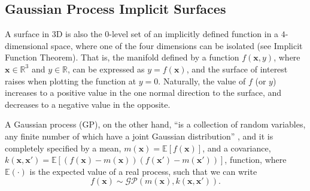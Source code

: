 \subsection{Gaussian Process Implicit Surfaces}
\label{sec:gpis}

A surface in 3D is also the $0$-level set of an implicitly defined function in a $4$-dimensional space, where one of the four dimensions can be isolated (see Implicit Function Theorem). That is, the manifold defined by a function $f(\mathbf{x},y)$, where $\mathbf{x} \in \mathbb{R}^3$ and $y \in \mathbb{R}$, can be expressed as $y = f(\mathbf{x})$, and the surface of interest raises when plotting the function at $y = 0$. Naturally, the value of $f$ (or $y$) increases to a positive value in the one normal direction to the surface, and decreases to a negative value in the opposite.

A Gaussian process (GP), on the other hand, ``is a collection of random variables, any finite number of which have a joint Gaussian distribution'' \citep[Def. 2.1]{Rasmussen2006Gaussian}, and it is completely specified by a mean, $m(\mathbf{x}) = \mathbb{E}[f(\mathbf{x})]$, and a covariance, $k(\mathbf{x},\mathbf{x}') = \mathbb{E}[(f(\mathbf{x}) - m(\mathbf{x}))(f(\mathbf{x}') - m(\mathbf{x}'))]$, function, where $\mathbb{E}(\cdot)$ is the expected value of a real process, such that we can write
\begin{equation}
f(\mathbf{x}) \sim \mathcal{GP}(m(\mathbf{x}), k(\mathbf{x},\mathbf{x}')).
\end{equation}

